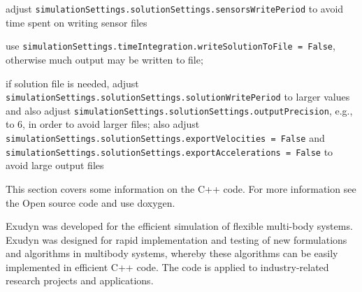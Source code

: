   \item adjust \texttt{simulationSettings.solutionSettings.sensorsWritePeriod} to avoid time spent on writing sensor files
  \item use \texttt{simulationSettings.timeIntegration.writeSolutionToFile = False}, otherwise much output may be written to file; 
  \item if solution file is needed, adjust \texttt{simulationSettings.solutionSettings.solutionWritePeriod} to larger values and also adjust \texttt{simulationSettings.solutionSettings.outputPrecision}, e.g., to 6, in order to avoid larger files; also adjust \texttt{simulationSettings.solutionSettings.exportVelocities = False} and \texttt{simulationSettings.solutionSettings.exportAccelerations = False} to avoid large output files
\ei












This section covers some information on the C++ code. For more information see the Open source code and use doxygen.

Exudyn was developed for the efficient simulation of flexible multi-body systems. Exudyn was designed for rapid implementation and testing of new formulations and algorithms in multibody systems, whereby these algorithms can be easily implemented in efficient C++ code. The code is applied to industry-related research projects and applications.

